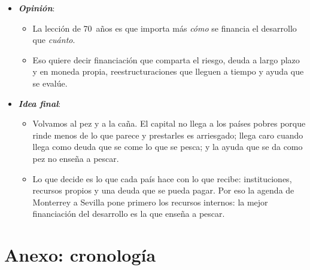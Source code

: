 \documentclass[11pt]{article}
\begin{document}
\begin{itemize}
\begin{itemize}
  \end{itemize}
\item \textbf{\emph{Opinión}}:
  \begin{itemize}
  \item La lección de 70~años es que importa más \emph{cómo} se financia el desarrollo que \emph{cuánto}.
  \item Eso quiere decir financiación que comparta el riesgo, deuda a largo plazo y en moneda propia, reestructuraciones que lleguen a tiempo y ayuda que se evalúe.
  \end{itemize}
\item \textbf{\emph{Idea final}}:
  \begin{itemize}
  \item Volvamos al pez y a la caña. El capital no llega a los países pobres porque rinde menos de lo que parece y prestarles es arriesgado; llega caro cuando llega como deuda que se come lo que se pesca; y la ayuda que se da como pez no enseña a pescar.
  \item Lo que decide es lo que cada país hace con lo que recibe: instituciones, recursos propios y una deuda que se pueda pagar. Por eso la agenda de Monterrey a Sevilla pone primero los recursos internos: la mejor financiación del desarrollo es la que enseña a pescar.
  \end{itemize}
\end{itemize}

\clearpage
\appendix

\section{Anexo: cronología}\label{anexo:cronologia}
\end{document}
